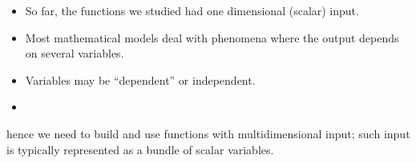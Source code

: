\begin{itemize}
\item So far, the functions we studied had  one dimensional (scalar) input.
\item Most mathematical models deal with phenomena where the output
depends on several variables.
\item Variables may be ``dependent'' or independent.
\item 
\end{itemize}

hence we need to build and use
functions with multidimensional input; such input is
typically represented as a bundle of scalar variables.